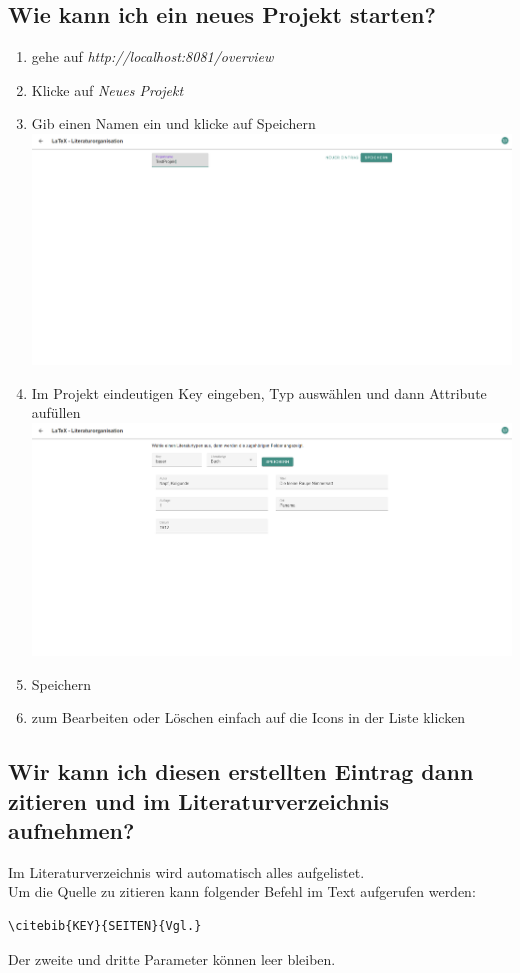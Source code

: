 \documentclass[12pt]{article}
\begin{document}
\subsection{Wie kann ich ein neues Projekt starten?}
\begin{enumerate}
\item gehe auf \textit{http://localhost:8081/overview}
\item Klicke auf \textit{Neues Projekt}
\item Gib einen Namen ein und klicke auf Speichern\newline
\includegraphics[width=\linewidth]{dokuImages/gui2_1.png}
\item Im Projekt eindeutigen Key eingeben, Typ auswählen und dann Attribute aufüllen\\
\includegraphics[width=\linewidth]{dokuImages/gui2_2.png}
\item Speichern
\item zum Bearbeiten oder Löschen einfach auf die Icons in der Liste klicken
\end{enumerate}

\subsection{Wir kann ich diesen erstellten Eintrag dann zitieren und im Literaturverzeichnis aufnehmen?}
Im Literaturverzeichnis wird automatisch alles aufgelistet.\\[6pt]Um die Quelle zu zitieren kann folgender Befehl im Text aufgerufen werden:
\begin{verbatim}
\citebib{KEY}{SEITEN}{Vgl.}
\end{verbatim}
Der zweite und dritte Parameter können leer bleiben.
\end{document}
